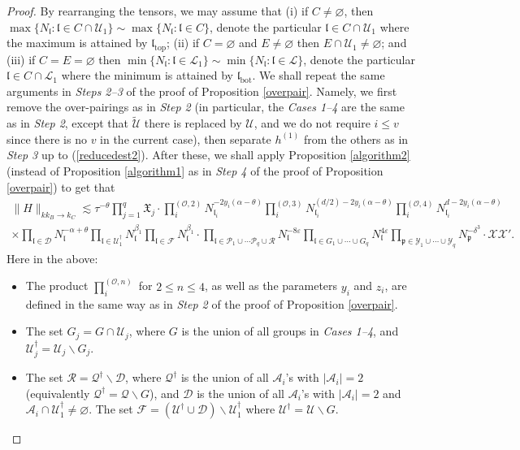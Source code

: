 \documentclass[11 pt,reqno]{amsart}
\theoremstyle{definition}
\theoremstyle{remark}
\numberwithin{equation}{section}
\newcommand{\Lc}{\mathcal{L}}
\newcommand{\Dc}{\mathcal{D}}
\newcommand{\Fc}{\mathcal{F}}
\newcommand{\Pc}{\mathcal{P}}
\newcommand{\Qc}{\mathcal{Q}}
\newcommand{\Rc}{\mathcal{R}}
\newcommand{\Uc}{\mathcal{U}}
\newcommand{\Ac}{\mathcal{A}}
\newcommand{\Xc}{\mathcal{X}}
\newcommand{\Yc}{\mathcal{Y}}
\newcommand{\pf}{\mathfrak{p}}
\newcommand{\Xf}{\mathfrak{X}}
\newcommand{\lf}{\mathfrak{l}}
\newcommand{\Os}{\mathscr{O}}
\begin{document}
{\begin{proof}
By rearranging the tensors, we may assume that (i) if $C\neq\varnothing$, then $\max\{N_\lf:\lf\in C\cap\Uc_1\}\sim\max\{N_\lf:\lf\in C\}$, denote the particular $\lf\in C\cap\Uc_1$  where the maximum is attained by $\lf_{\mathrm{top}}$; (ii) if $C=\varnothing$ and $E\neq\varnothing$ then $E\cap\Uc_1\neq\varnothing$; and (iii) if $C=E=\varnothing$ then $\min\{N_\lf:\lf\in\Lc_1\}\sim\min\{N_\lf:\lf\in\Lc\}$, denote the particular $\lf\in C\cap\Lc_1$  where the minimum is attained by $\lf_{\mathrm{bot}}$. We shall repeat the same arguments in \emph{Steps 2--3} of the proof of Proposition \ref{overpair}. Namely, we first remove the over-pairings as in \emph{Step 2} (in particular, the \emph{Cases 1--4} are the same as in \emph{Step 2}, except that $\widetilde{\Uc}$ there is replaced by $\Uc$, and we do not require $i\leq v$ since there is no $v$ in the current case), then separate $h^{(1)}$ from the others as in \emph{Step 3} up to (\ref{reducedest2}). After these, we shall apply Proposition \ref{algorithm2} (instead of Proposition \ref{algorithm1} as in \emph{Step 4} of the proof of Proposition \ref{overpair}) to get that
\begin{multline}\label{Prop5.5:bound}\|H\|_{kk_B\to k_C}\lesssim\tau^{-\theta}\prod_{j=1}^q\Xf_j\cdot\prod_i^{(\Os,2)}N_{\lf_i}^{-2y_i(\alpha-\theta)}\prod_i^{(\Os,3)}N_{\lf_i}^{(d/2)-2y_i(\alpha-\theta)}\prod_i^{(\Os,4)}N_{\lf_i}^{d-2y_i(\alpha-\theta)}\\\times \prod_{\lf\in\Dc}N_\lf^{-\alpha+\theta}\prod_{\lf\in\Uc_1^\dagger}N_\lf^{\beta_1}\prod_{\lf\in\Fc}N_\lf^{\beta_1}\cdot\prod_{\lf\in \Pc_1\cup\cdots \Pc_q\cup\Rc}N_\lf^{-8\varepsilon}\prod_{\lf\in G_1\cup\cdots\cup G_q}N_\lf^{4\varepsilon}\prod_{\pf\in\Yc_1\cup\cdots\cup\Yc_q}N_\pf^{-\delta^3}\cdot\Xc\Xc'.
\end{multline}  Here in the above:
\begin{itemize}
\item The product $\prod_i^{(\Os,n)}$ for $2\leq n\leq 4$, as well as the parameters $y_i$ and $z_i$, are defined in the same way as in \emph{Step 2} of the proof of Proposition \ref{overpair}.
\item The set $G_j=G\cap\Uc_j$, where $G$ is the union of all groups in \emph{Cases 1--4}, and $\Uc_j^\dagger=\Uc_j\backslash G_j$.
\item The set $\Rc=\Qc^\dagger\backslash \Dc$, where $\Qc^\dagger$ is the union of all $\Ac_i$'s with $|\Ac_i|=2$ (equivalently $\Qc^\dagger=\Qc\backslash G$), and $\Dc$ is the union of all $\Ac_i$'s with $|\Ac_i|=2$ and $\Ac_i\cap\Uc_1^\dagger\neq\varnothing$. The set $\Fc=(\Uc^\dagger\cup\Dc)\backslash\Uc_1^\dagger$ where $\Uc^\dagger=\Uc\backslash G$.

\end{itemize}
\end{proof}}
\end{document}
